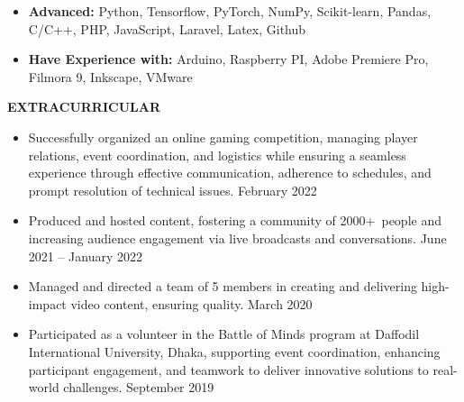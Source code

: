 \documentclass[a4paper, 12pt]{article}
\begin{document}
\begin{itemize}[noitemsep, topsep=0pt, partopsep=0pt, parsep=0pt]
    \item \textbf{Advanced:} Python, Tensorflow, PyTorch, NumPy, Scikit-learn, Pandas, C/C++, PHP, JavaScript, Laravel, Latex, Github
    \item \textbf{Have Experience with:} Arduino, Raspberry PI, Adobe Premiere Pro, Filmora 9, Inkscape, VMware
\end{itemize}

\begin{flushleft}
	\noindent
	\textbf{EXTRACURRICULAR}\hrulefill
\end{flushleft}
\vspace{-12pt}

\begin{itemize}[noitemsep, topsep=0pt, partopsep=0pt, parsep=0pt]
	\item Successfully organized an online gaming competition, managing player relations, event coordination, and logistics while ensuring a seamless experience through effective communication, adherence to schedules, and prompt resolution of technical issues.  \hfill February 2022
	\item Produced and hosted content, fostering a community of 2000+ people and increasing audience engagement via live broadcasts and conversations. \hfill June 2021 -- January 2022
	\item Managed and directed a team of 5 members in creating and delivering high-impact video content, ensuring quality. \hfill March 2020
    \item Participated as a volunteer in the Battle of Minds program at Daffodil International University, Dhaka, supporting event coordination, enhancing participant engagement, and teamwork to deliver innovative solutions to real-world challenges. \hfill September 2019 
\end{itemize}

\end{document}
